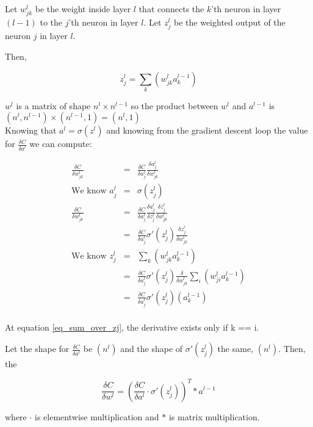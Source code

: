 \documentclass{article}
\begin{document}
Let $w_{jk}^{l}$ be the weight inside layer $l$ that connects the $k$'th neuron in layer $(l-1)$ to the
$j$'th neuron in layer $l$. Let $z^l_j$ be the weighted output of the neuron $j$ in layer $l$.

Then, 

\begin{equation}
	z_j^l = \sum_{k}\left( w_{jk}^l a^{l-1}_k  \right)
\end{equation}

$w^l$ is a matrix of shape $n^l \times n^{l-1}$ so the product between $w^l$ and $a^{l-1}$ is  $(n^l, n^{l-1}) \times (n^{l-1}, 1) = (n^l, 1)$\\

Knowing that $a^l{=}\sigma (z^l)$ and knowing from the gradient descent loop the value for  $\frac{\delta C}{\delta a^l}$ we can compute:

\begin{eqnarray}
	\frac{\delta C}{\delta w^l_{jk}} &=& \frac{\delta C}{\delta a^l_j} \frac{\delta a^l_j}{\delta w^l_{jk}} \label{eq_dCost_dWeight}	 \\
	\text{We know } a^l_j&=&\sigma (z^l_j) \\
	\frac{\delta C}{\delta w^l_{jk}} &=&\frac{\delta C}{\delta a^l_j} \frac{\delta a^l_j}{\delta z^l_j} \frac{\delta z^l_j} {\delta w^l_{jk}}\\
	&=&\frac{\delta C}{\delta a^l_j} \sigma ' (z^l_j) \frac{\delta z^l_j} {\delta w^l_{jk}}\\
	\text{We know } z_j^l &=& \sum_{k}\left( w_{jk}^l a^{l-1}_k  \right)\\
	\label{eq_sum_over_zj}
	&=&\frac{\delta C}{\delta a^l_j} \sigma ' (z^l_j) \frac{\delta} {\delta w^l_{jk}}  \sum_{i}\left( w_{ji}^l a^{l-1}_k  \right) \\
	&=&\frac{\delta C}{\delta a^l_j} \sigma ' (z^l_j) \left(a^{l-1}_k \right) \\
\end{eqnarray}

At equation \eqref{eq_sum_over_zj}, the derivative exists only if k == i. 

Let the shape for $\frac{\delta C}{\delta a^l}$ be $(n^{l})$ and the shape of $\sigma ' (z^l_j)$ the same, $(n^{l})$. Then, the

\begin{equation}
	\frac{\delta C}{\delta w^l} = \left(\frac{\delta C}{\delta a^l} \cdot \sigma ' (z^l_j) \right)^T * a^{l-1}
\end{equation}

where $\cdot$ is elementwise multiplication and $*$ is matrix multiplication.
\end{document}
